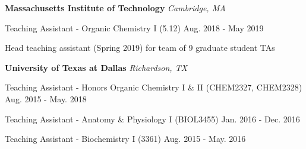 
\begin{rSection}{}{\bodyfont\bfseries\color{black} \hspace{-1.6em} {Massachusetts Institute of Technology}} \hfill{\bodyfont\slshape\color{awesome} {Cambridge, MA} \vspace{-0.5em}}
\end{rSection}

\begin{cventries}

  \cventry
    {Teaching Assistant - Organic Chemistry I (5.12)} %
    {} %
    {} %
    {Aug. 2018 - May 2019} %
    {
      \begin{cvitems} %
        \item[] {Head teaching assistant (Spring 2019) for team of 9 graduate student TAs}
      \end{cvitems}
    }

\begin{rSection}{}{\bodyfont\bfseries\color{black} \hspace{-1.6em} {University of Texas at Dallas}} \hfill{\bodyfont\slshape\color{awesome} {Richardson, TX} \vspace{-0.5em}}
\end{rSection}

\cventryshort
{Teaching Assistant - Honors Organic Chemistry I \& II (CHEM2327, CHEM2328)} %
{} %
{} %
{Aug. 2015 - May. 2018} %

\cventryshort
  {Teaching Assistant - Anatomy \& Physiology I (BIOL3455)} %
  {} %
  {} %
  {Jan. 2016 - Dec. 2016} %

\cventryshort
{Teaching Assistant - Biochemistry I (3361)} %
{} %
{} %
{Aug. 2015 - May. 2016} %

\end{cventries}
